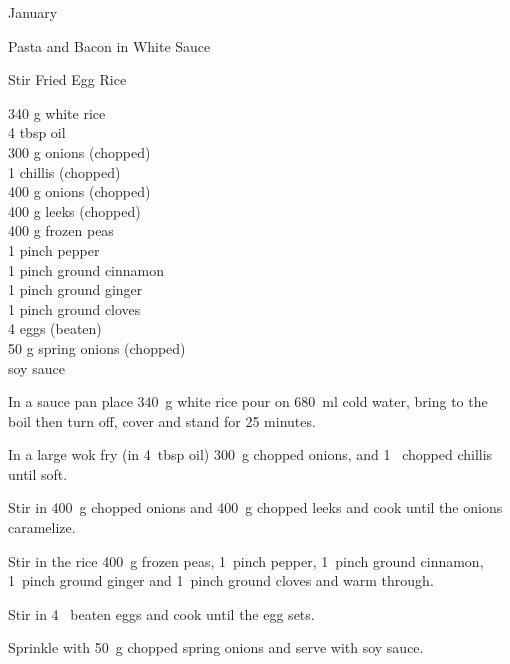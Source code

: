 \begin{menu}{January}
\begin{recipe}{2}{Pasta and Bacon in White Sauce}
\begin{instructions}
    \end{instructions}
    \end{recipe}%
  
    \begin{recipe}{2}{Stir Fried Egg Rice}%
		\begin{ingredients}
		340 g white rice  \\
	4 tbsp oil  \\
	300 g onions (chopped) \\
	1  chillis (chopped) \\
	400 g onions (chopped) \\
	400 g leeks (chopped) \\
	400 g frozen peas  \\
	1 pinch pepper  \\
	1 pinch ground cinnamon  \\
	1 pinch ground ginger  \\
	1 pinch ground cloves  \\
	4  eggs (beaten) \\
	50 g spring onions (chopped) \\
	  soy sauce  \\
	
		\end{ingredients}
	
	
    \begin{instructions}
    \item 
    In a
    sauce pan
    place
    340~g  white rice
    pour on
    680~ml  cold water,
    bring to the boil then turn off, cover and stand for 25 minutes.
  \item 
        In a large wok fry
        (in 4~tbsp  oil)
        300~g chopped onions,
        and
        1~ chopped chillis
        until soft.
      \item 
        Stir in
        400~g chopped onions
        and
        400~g chopped leeks
        and cook until the onions caramelize.
      \item 
        Stir in the rice
        400~g  frozen peas,
        1~pinch  pepper,
        1~pinch  ground cinnamon,
        1~pinch  ground ginger
        and
        1~pinch  ground cloves
        and warm through.
      \item 
        Stir in
        4~ beaten eggs
        and cook until the egg sets.
      \item 
        Sprinkle with
        50~g chopped spring onions
        and serve with
          soy sauce.
      

\end{instructions}
\end{recipe}
\end{menu}
